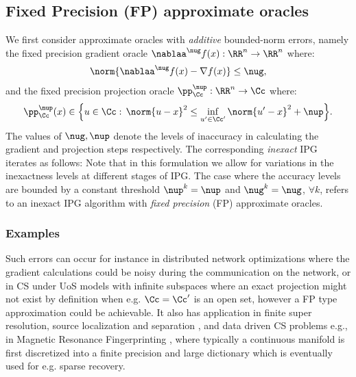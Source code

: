 \subsection{Fixed Precision (FP) approximate oracles}
\label{sec:FP}
We first consider 
approximate oracles with \emph{additive} bounded-norm 
errors, namely the fixed precision gradient oracle $\nablaa^{\nug} f(x):\RR^n\rightarrow \RR^n$ where:
\begin{align}
\norm{\nablaa^{\nug} f(x) -\nabla f(x)}\leq \nug, \label{eq:grad} 
\end{align}
and the fixed precision projection oracle $\pp_\Cc^{\nup}:\RR^n\rightarrow\Cc$ where:
\begin{align}
\pp_\Cc^{\nup}(x) \in \Big\{ u\in \Cc :\,	\norm{u-x}^2 \leq \inf_{u'\in \Cc'}\norm{u'-x}^2 +\nup  \Big\}.\label{eq:proj1}
\end{align} 
The values of $\nug,\nup$ denote the levels of inaccuracy in calculating the gradient and projection steps respectively. 
The corresponding \emph{inexact} IPG
iterates as follows:
\eql{\label{eq:inIP} x^k = \pp^{\nup^k}_{\Cc}\left(x^{k-1}
-\mu \nablaa^{\nug^k} f(x^{k-1})\right).}
Note that in this formulation we allow for variations in the inexactness levels at different stages of IPG. %
The case where the accuracy levels are bounded by a constant threshold $\nup^k=\nup$ and $\nug^k=\nug$, $\forall k$, refers to an inexact IPG algorithm with \emph{fixed precision} (FP) approximate oracles.


\subsubsection*{Examples}
Such errors can occur for instance in distributed network
optimizations where the gradient calculations could be noisy during the communication on the network\nref[.], or in CS under UoS models with infinite subspaces \cite{Blumen} where an exact projection might not exist by definition when e.g. $\Cc=\Cc'$ is an open set, however a FP type approximation could be achievable. It also has application in finite super resolution\nref, source localization and separation \cite{TASL14,SCOOP}, and data driven CS problems e.g., in Magnetic Resonance Fingerprinting \cite{MRF,BLIPsiam},  where typically a continuous manifold is first discretized into a finite precision and large dictionary which is eventually used for e.g. sparse recovery.
